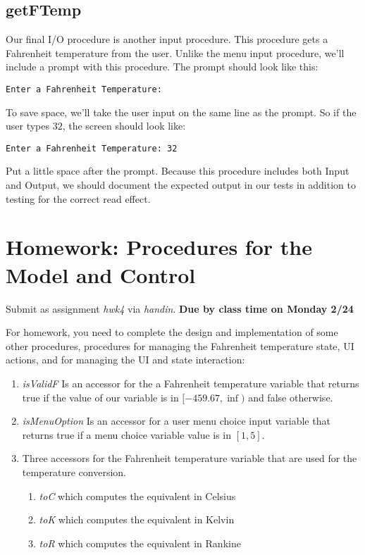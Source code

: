 \documentclass[]{tufte-handout}
\begin{document}
\subsection{getFTemp}

Our final I/O procedure is another input procedure. This procedure gets a Fahrenheit temperature from the user.  Unlike the menu input procedure, we'll include a prompt with this procedure. The prompt should look like this:
\begin{verbatim}
Enter a Fahrenheit Temperature:  
\end{verbatim}
To save space, we'll take the user input on the same line as the prompt. So if the user types $32$, the screen should look like:
\begin{verbatim}
Enter a Fahrenheit Temperature: 32 
\end{verbatim}
Put a little space after the prompt. Because this procedure includes both Input and Output, we should document the expected output in our tests in addition to testing for the correct read effect.  


\section{Homework: Procedures for the Model and Control}

\begin{center}
Submit as assignment \textit{hwk4} via \textit{handin}. \textbf{Due by class time on Monday 2/24}
\end{center}

For homework, you need to complete the design and implementation of some other procedures, procedures for managing the Fahrenheit temperature state, UI actions, and for managing the UI and state interaction:
\begin{enumerate}
\item \textit{isValidF} Is an accessor for the a Fahrenheit temperature variable that returns true if the value of our variable is in $[-459.67,\inf)$ and false otherwise.
\item \textit{isMenuOption} Is an accessor for a user menu choice input variable that returns true if a menu choice variable value is in $[1,5]$.
\item Three accessors for the Fahrenheit temperature variable that are used for the temperature conversion.
\begin{enumerate}
\item \textit{toC} which computes the equivalent in Celsius
\item \textit{toK} which computes the equivalent in Kelvin
\item \textit{toR} which computes the equivalent in Rankine
\end{enumerate}
\end{enumerate}
\end{document}
